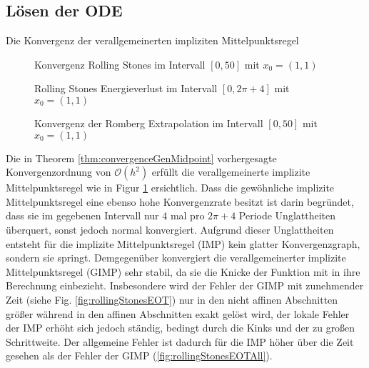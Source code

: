 \subsection{Lösen der ODE}
Die Konvergenz der verallgemeinerten impliziten Mittelpunktsregel 
\begin{figure}
\centering

\caption{Konvergenz Rolling Stones im Intervall $[0,50]$ mit $x_0=(1,1)$}
\label{fig:rollingStonesConvergence}
\end{figure}


\begin{figure}[H]
\footnotesize 
\centering
\begin{minipage}[b]{0.45\linewidth}

\caption{Rolling Stones Energieverlust im Intervall $[0,2\pi+4]$ mit $x_0=(1,1)$}
\label{fig:rollingStonesEnergyError}
\end{minipage}
\quad
\begin{minipage}[b]{0.45\linewidth}

\caption{Konvergenz der Romberg Extrapolation im Intervall $[0,50]$ mit $x_0=(1,1)$}
\label{fig:rollingStonesConvergenceRomberg}
\end{minipage}

\end{figure}


Die in Theorem \ref{thm:convergenceGenMidpoint} vorhergesagte Konvergenzordnung von $\mathcal O(h^2)$ erfüllt die verallgemeinerte implizite Mittelpunktsregel wie in Figur \ref{fig:rollingStonesConvergence} ersichtlich.
Dass die gewöhnliche implizite Mittelpunktsregel eine ebenso hohe Konvergenzrate besitzt ist darin begründet, dass sie im gegebenen Intervall nur $4$ mal pro $2\pi+4$ Periode Unglattheiten überquert, sonst jedoch normal konvergiert. Aufgrund dieser Unglattheiten entsteht für die implizite Mittelpunktsregel (IMP) kein glatter Konvergenzgraph, sondern sie springt. Demgegenüber konvergiert die verallgemeinerter implizite Mittelpunktsregel (GIMP) sehr stabil, da sie die Knicke der Funktion mit in ihre Berechnung einbezieht.
Insbesondere wird der Fehler der GIMP mit zunehmender Zeit (siehe Fig. \ref{fig:rollingStonesEOT}) nur in den nicht affinen Abschnitten größer während in den affinen Abschnitten exakt gelöst wird, der lokale Fehler der IMP erhöht sich jedoch ständig, bedingt durch die Kinks und der zu großen Schrittweite. Der allgemeine Fehler ist dadurch für die IMP höher über die Zeit gesehen als der Fehler der GIMP (\ref{fig:rollingStonesEOTAll}).

